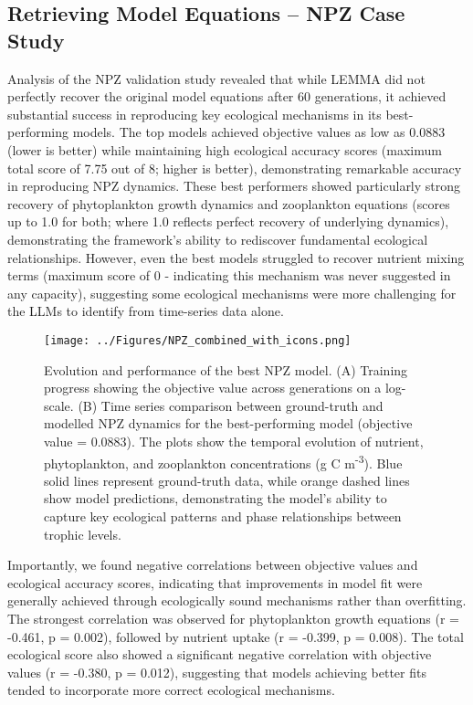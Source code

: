 \subsection{Retrieving Model Equations -- NPZ Case Study}

Analysis of the NPZ validation study revealed that while LEMMA did not perfectly recover the original model equations after 60 generations, it achieved substantial success in reproducing key ecological mechanisms in its best-performing models. The top models achieved objective values as low as 0.0883 (lower is better) while maintaining high ecological accuracy scores (maximum total score of 7.75 out of 8; higher is better), demonstrating remarkable accuracy in reproducing NPZ dynamics. These best performers showed particularly strong recovery of phytoplankton growth dynamics and zooplankton equations (scores up to 1.0 for both; where 1.0 reflects perfect recovery of underlying dynamics), demonstrating the framework's ability to rediscover fundamental ecological relationships. However, even the best models struggled to recover nutrient mixing terms (maximum score of 0 - indicating this mechanism was never suggested in any capacity), suggesting some ecological mechanisms were more challenging for the LLMs to identify from time-series data alone.

\begin{figure}[H]
\centering
\texttt{[image: ../Figures/NPZ\_combined\_with\_icons.png]}
\caption{Evolution and performance of the best NPZ model. (A) Training progress showing the objective value across generations on a log-scale. (B) Time series comparison between ground-truth and modelled NPZ dynamics for the best-performing model (objective value = 0.0883). The plots show the temporal evolution of nutrient, phytoplankton, and zooplankton concentrations (g C m\textsuperscript{-3}). Blue solid lines represent ground-truth data, while orange dashed lines show model predictions, demonstrating the model's ability to capture key ecological patterns and phase relationships between trophic levels.}
\label{fig:npz_timeseries}
\end{figure}

Importantly, we found negative correlations between objective values and ecological accuracy scores, indicating that improvements in model fit were generally achieved through ecologically sound mechanisms rather than overfitting. The strongest correlation was observed for phytoplankton growth equations (r = -0.461, p = 0.002), followed by nutrient uptake (r = -0.399, p = 0.008). The total ecological score also showed a significant negative correlation with objective values (r = -0.380, p = 0.012), suggesting that models achieving better fits tended to incorporate more correct ecological mechanisms.

